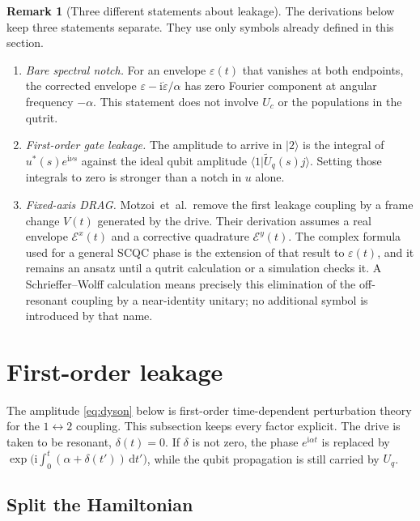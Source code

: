 \documentclass[11pt,a4paper]{article}
\theoremstyle{definition}
\newtheorem{remark}{Remark}
\newcommand{\ket}[1]{\lvert #1\rangle}
\newcommand{\braket}[2]{\langle #1\vert #2\rangle}
\newcommand{\dd}{\mathrm{d}}
\newcommand{\ii}{\mathrm{i}}
\newcommand{\eps}{\varepsilon}
\begin{document}
\begin{remark}[Three different statements about leakage]
\label{rem:three}
The derivations below keep three statements separate.  They use only symbols
already defined in this section.
\begin{enumerate}
  \item \emph{Bare spectral notch.}  For an envelope \(\eps(t)\) that vanishes
        at both endpoints, the corrected envelope
        \(\eps-\ii\dot\eps/\alpha\) has zero Fourier component at angular
        frequency \(-\alpha\).  This statement does not involve \(U_c\) or the
        populations in the qutrit.
  \item \emph{First-order gate leakage.}  The amplitude to arrive in \(\ket2\)
        is the integral of \(u^*(s)e^{\ii\nu s}\) against the ideal qubit
        amplitude \(\braket{1}{\tilde U_q(s)j}\).  Setting those integrals to
        zero is stronger than a notch in \(u\) alone.
  \item \emph{Fixed-axis DRAG.}  Motzoi~et~al.\ remove the first leakage
        coupling by a frame change \(V(t)\) generated by the drive.  Their
        derivation assumes a real envelope \(\mathcal{E}^x(t)\) and a
        corrective quadrature \(\mathcal{E}^y(t)\).  The complex formula used
        for a general SCQC phase is the extension of that result to
        \(\eps(t)\), and it remains an ansatz until a qutrit calculation or a
        simulation checks it.  A Schrieffer--Wolff calculation means precisely
        this elimination of the off-resonant coupling by a near-identity
        unitary; no additional symbol is introduced by that name.
\end{enumerate}
\end{remark}

\section{First-order leakage}
\label{sec:leakage}

The amplitude \eqref{eq:dyson} below is first-order time-dependent perturbation
theory for the \(1\leftrightarrow 2\) coupling.  This subsection keeps every
factor explicit.  The drive is taken to be resonant, \(\delta(t)=0\).  If
\(\delta\) is not zero, the phase \(e^{\ii\alpha t}\) is replaced by
\(\exp\bigl(\ii\int_0^t(\alpha+\delta(t'))\,\dd t'\bigr)\), while the qubit
propagation is still carried by \(U_q\).

\subsection{Split the Hamiltonian}
\end{document}
